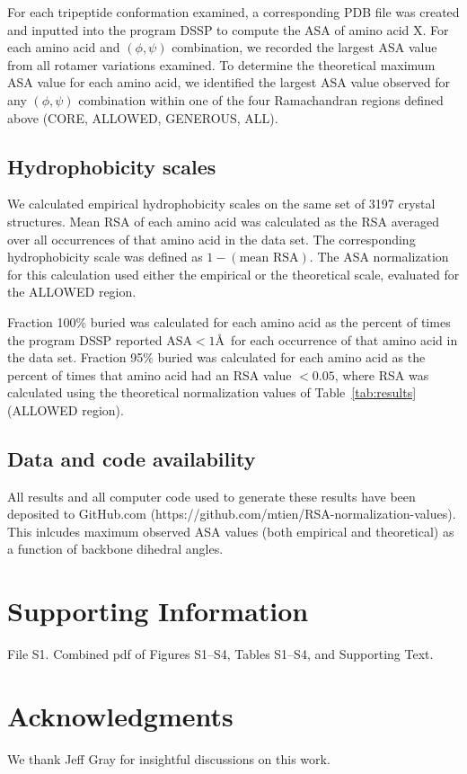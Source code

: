 \documentclass[11pt]{article}
\begin{document}
For each tripeptide conformation examined, a corresponding PDB file was created and inputted into the program DSSP \cite{Kabsch1983} to compute the ASA of amino acid X. For each amino acid and $(\phi, \psi)$ combination, we recorded the largest ASA value from all rotamer variations examined. To determine the theoretical maximum ASA value for each amino acid, we identified the largest ASA value observed for any $(\phi, \psi)$ combination within one of the four Ramachandran regions defined above (CORE, ALLOWED, GENEROUS, ALL).

\subsection*{Hydrophobicity scales}

We calculated empirical hydrophobicity scales on the same set of 3197 crystal structures. Mean RSA of each amino acid was calculated as the RSA averaged over all occurrences of that amino acid in the data set. The corresponding hydrophobicity scale was defined as $1-(\text{mean RSA})$. The ASA normalization for this calculation used either the empirical or the theoretical scale, evaluated for the ALLOWED region.

Fraction 100\% buried was calculated for each amino acid as the percent of times the program DSSP reported $\text{ASA}<1$\AA\ for each occurrence of that amino acid in the data set. Fraction 95\% buried was calculated for each amino acid as the percent of times that amino acid had an RSA value $<0.05$, where RSA was calculated using the theoretical normalization values of Table~\ref{tab:results} (ALLOWED region).

\subsection*{Data and code availability}
All results and all computer code used to generate these results have been deposited to GitHub.com (https://github.com/mtien/RSA-normalization-values). This inlcudes maximum observed ASA values (both empirical and theoretical) as a function of backbone dihedral angles.

\section*{Supporting Information}

File S1. Combined pdf of Figures S1--S4, Tables S1--S4, and Supporting Text.

\section*{Acknowledgments}
We thank Jeff Gray for insightful discussions on this work.
\end{document}
